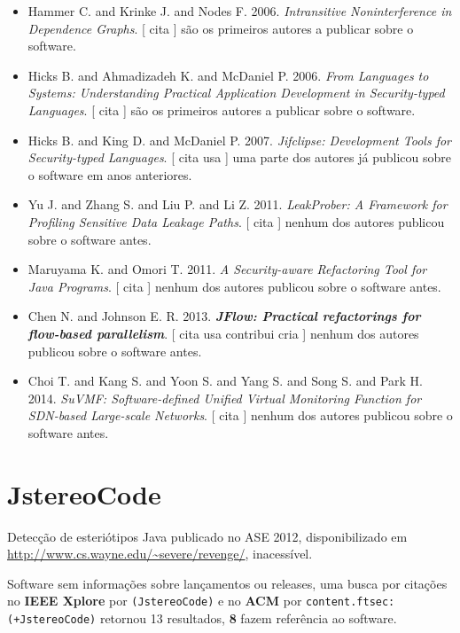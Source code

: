 \begin{itemize}
\item Hammer C. and Krinke J. and Nodes F.
      2006.
        \textit{ Intransitive Noninterference in Dependence Graphs}.
      [
          cita
      ]
são os primeiros autores a publicar sobre o software.
\item Hicks B. and Ahmadizadeh K. and McDaniel P.
      2006.
        \textit{ From Languages to Systems: Understanding Practical Application Development in Security-typed Languages}.
      [
          cita
      ]
são os primeiros autores a publicar sobre o software.
\item Hicks B. and King D. and McDaniel P.
      2007.
        \textit{ Jifclipse: Development Tools for Security-typed Languages}.
      [
          cita
          usa
      ]
uma parte dos autores já publicou sobre o software em anos anteriores.
\item Yu J. and Zhang S. and Liu P. and Li Z.
      2011.
        \textit{ LeakProber: A Framework for Profiling Sensitive Data Leakage Paths}.
      [
          cita
      ]
nenhum dos autores publicou sobre o software antes.
\item Maruyama K. and Omori T.
      2011.
        \textit{ A Security-aware Refactoring Tool for Java Programs}.
      [
          cita
      ]
nenhum dos autores publicou sobre o software antes.
\item Chen N. and Johnson E. R.
      2013.
        \textbf{\textit{ JFlow: Practical refactorings for flow-based parallelism}}.
      [
          cita
          usa
          contribui
          cria
      ]
nenhum dos autores publicou sobre o software antes.
\item Choi T. and Kang S. and Yoon S. and Yang S. and Song S. and Park H.
      2014.
        \textit{ SuVMF: Software-defined Unified Virtual Monitoring Function for SDN-based Large-scale Networks}.
      [
          cita
      ]
nenhum dos autores publicou sobre o software antes.
\end{itemize}
\section{JstereoCode}

Detecção de esteriótipos Java
publicado no ASE 2012,
disponibilizado em \url{http://www.cs.wayne.edu/~severe/revenge/},
inacessível.

Software sem informações sobre lançamentos ou releases,
uma busca por citações no {\bf IEEE Xplore} por
\texttt{(JstereoCode)}
e no {\bf ACM} por
\texttt{content.ftsec:(+JstereoCode)}
retornou
13 resultados,
{\bf 8} fazem referência ao software.

